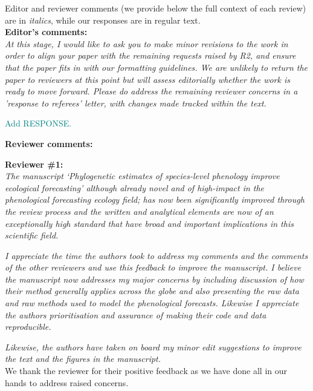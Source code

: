\documentclass[11pt]{article}
\begin{document}
Editor and reviewer comments (we provide below the full context of each review) are in \emph{italics}, while our responses are in regular text. 
\\ %

{\bf Editor's comments:} \\


\emph{At this stage, I would like to ask you to make minor revisions to the work in order to align your paper with the remaining requests raised by R2, and ensure that the paper fits in with our formatting guidelines. We are unlikely to return the paper to reviewers at this point but will assess editorially whether the work is ready to move forward. Please do address the remaining reviewer concerns in a 'response to referees' letter, with changes made tracked within the text.}

\textcolor{teal}{Add RESPONSE.}

{\bf Reviewer comments:} 

{\bf Reviewer \#1:}\\

\emph{The manuscript ‘Phylogenetic estimates of species-level phenology improve ecological forecasting’ although already novel and of high-impact in the phenological forecasting ecology field; has now been significantly improved through the review process and the written and analytical elements are now of an exceptionally high standard that have broad and important implications in this scientific field.}

\emph{I appreciate the time the authors took to address my comments and the comments of the other reviewers and use this feedback to improve the manuscript. I believe the manuscript now addresses my major concerns by including discussion of how their method generally applies across the globe and also presenting the raw data and raw methods used to model the phenological forecasts. Likewise I appreciate the authors prioritisation and assurance of making their code and data reproducible.}

\emph{Likewise, the authors have taken on board my minor edit suggestions to improve the text and the figures in the manuscript.}\\

We thank the reviewer for their positive feedback as we have done all in our hands to address raised concerns.\\
\end{document}
